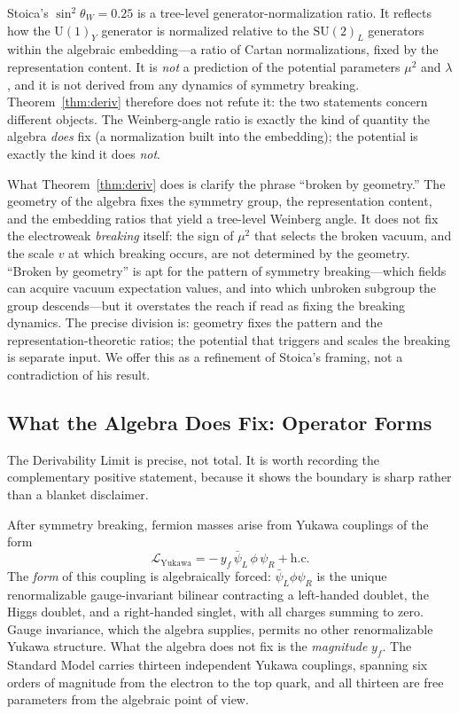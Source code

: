 \documentclass[12pt]{article}
\theoremstyle{remark}
\newcommand{\su}{\mathrm{SU}}
\newcommand{\UU}{\mathrm{U}}
\begin{document}
Stoica's $\sin^2\theta_W=0.25$ is a tree-level generator-normalization ratio.
It reflects how the $\UU(1)_Y$ generator is normalized relative to the
$\su(2)_L$ generators within the algebraic embedding---a ratio of Cartan
normalizations, fixed by the representation content.  It is \emph{not} a
prediction of the potential parameters $\mu^2$ and $\lambda$, and it is not
derived from any dynamics of symmetry breaking.  Theorem~\ref{thm:deriv}
therefore does not refute it: the two statements concern different objects.  The
Weinberg-angle ratio is exactly the kind of quantity the algebra \emph{does} fix
(a normalization built into the embedding); the potential is exactly the kind it
does \emph{not}.

What Theorem~\ref{thm:deriv} does is clarify the phrase ``broken by geometry.''
The geometry of the algebra fixes the symmetry group, the representation
content, and the embedding ratios that yield a tree-level Weinberg angle.  It
does not fix the electroweak \emph{breaking} itself: the sign of $\mu^2$ that
selects the broken vacuum, and the scale $v$ at which breaking occurs, are not
determined by the geometry.  ``Broken by geometry'' is apt for the pattern of
symmetry breaking---which fields can acquire vacuum expectation values, and into
which unbroken subgroup the group descends---but it overstates the reach if read
as fixing the breaking dynamics.  The precise division is: geometry fixes the
pattern and the representation-theoretic ratios; the potential that triggers and
scales the breaking is separate input.  We offer this as a refinement of
Stoica's framing, not a contradiction of his result.

\subsection{What the Algebra Does Fix: Operator Forms}
\label{sec:deriv-yukawa}

The Derivability Limit is precise, not total.  It is worth recording the
complementary positive statement, because it shows the boundary is sharp rather
than a blanket disclaimer.

After symmetry breaking, fermion masses arise from Yukawa couplings of the form
\begin{equation}
	\mathcal{L}_{\mathrm{Yukawa}}
	= -\,y_f\,\bar\psi_L\,\phi\,\psi_R + \text{h.c.}
	\label{eq:yuk}
\end{equation}
The \emph{form} of this coupling is algebraically forced:
$\bar\psi_L\phi\psi_R$ is the unique renormalizable gauge-invariant bilinear
contracting a left-handed doublet, the Higgs doublet, and a right-handed
singlet, with all charges summing to zero.  Gauge invariance, which the algebra
supplies, permits no other renormalizable Yukawa structure.  What the algebra
does not fix is the \emph{magnitude} $y_f$.  The Standard Model carries thirteen
independent Yukawa couplings, spanning six orders of magnitude from the electron
to the top quark, and all thirteen are free parameters from the algebraic point
of view.
\end{document}
